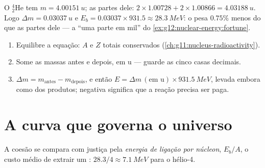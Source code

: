 \begin{example}[Hélio-4]\label{ex:g12:nuclear-energy:helium}
O  ${}^{4}_{2}\mathrm{He}$ tem $m = \qty{4.00151}{u}$; as partes dele:
$2 \times 1.00728 + 2 \times 1.00866 = \qty{4.03188}{u}$. Logo
$\Delta m = \qty{0.03037}{u}$ e $E_b = 0.03037 \times 931.5 \approx \qty{28.3}{MeV}$: o
 pesa $0.75\%$ menos do que as partes dele --- a ``uma parte em mil'' do
\cref{ex:g12:nuclear-energy:fortune}.
\end{example}

\begin{method}\label{met:g12:nuclear-energy:balance}
\begin{enumerate}
  \item Equilibre a equação: $A$ e $Z$ totais conservados
        (\cref{ch:g11:nucleus-radioactivity}).
  \item Some as massas antes e depois, em \unit{u} --- guarde as cinco casas decimais.
  \item $\Delta m = m_{\text{antes}} - m_{\text{depois}}$, e então
        $E = \Delta m\,(\text{em u}) \times \qty{931.5}{MeV}$, levada embora como  dos produtos; negativa significa que a reação precisa ser paga.
\end{enumerate}
\end{method}

\section{A curva que governa o universo}

\begin{definition}\label{def:g12:nuclear-energy:pernucleon}
A coesão se compara com justiça pela \emph{energia de ligação por
núcleon}, $E_b/A$, o custo médio de extrair um
: $28.3/4 \approx \qty{7.1}{MeV}$ para o hélio-4.
\end{definition}

